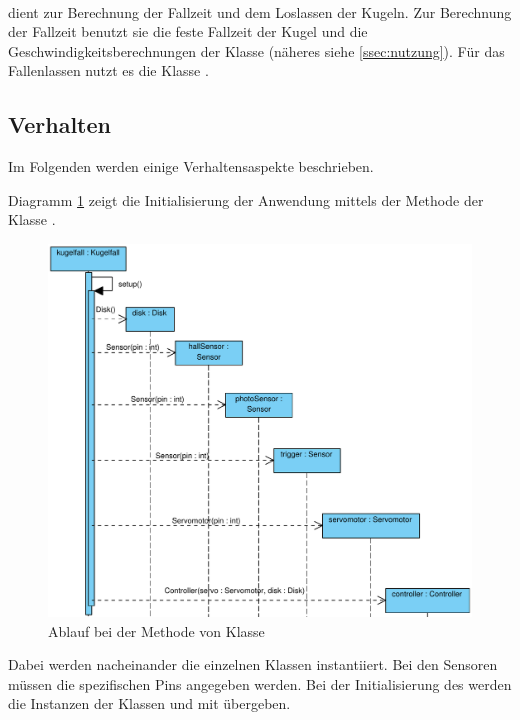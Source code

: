 \paragraph{} dient zur Berechnung der Fallzeit und dem Loslassen der Kugeln.
Zur Berechnung der Fallzeit benutzt sie die feste Fallzeit der Kugel  und die Geschwindigkeitsberechnungen der Klasse  (näheres siehe \ref{ssec:nutzung}).
Für das Fallenlassen nutzt es die Klasse .

\subsection{Verhalten}
Im Folgenden werden einige Verhaltensaspekte beschrieben.

Diagramm \ref{fig:setup_diagram} zeigt die Initialisierung der Anwendung mittels der Methode  der Klasse .
\begin{figure}[htbp]
	\centering
	\includegraphics[width=\linewidth]{abb/setup_cropped}
	\caption{Ablauf bei der Methode  von Klasse }
	\label{fig:setup_diagram}
\end{figure}
Dabei werden nacheinander die einzelnen Klassen instantiiert. 
Bei den Sensoren müssen die spezifischen Pins angegeben werden.
Bei der Initialisierung des  werden die Instanzen der Klassen  und  mit übergeben.

